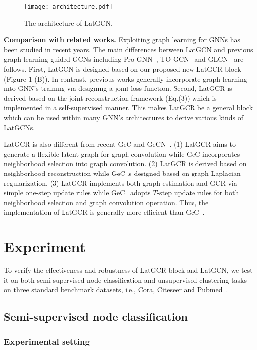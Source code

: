\documentclass{article}
\begin{document}
\begin{figure*}[ht]
\centering
\texttt{[image: architecture.pdf]}
  \caption{The architecture of LatGCN.}\label{fig:architecture}
\end{figure*}



\textbf{Comparison with related works.}
Exploiting graph learning for GNNs has been studied in recent years.
The main differences between LatGCN and previous graph learning guided GCNs including Pro-GNN~\cite{prognn}, TO-GCN~\cite{TOGCN} and GLCN~\cite{GLCN} are follows.
First, LatGCN is designed based on our proposed new LatGCR block (Figure 1 (B)).
In contrast, previous works generally incorporate graph learning into GNN's training via designing a joint loss function.
Second, LatGCR is derived based on the joint reconstruction framework (Eq.(3)) which is implemented in a self-supervised manner. This makes LatGCR be a general block which can be used within many GNN's architectures to derive various kinds of LatGCNs.

LatGCR is also different from recent GeC and GeCN~\cite{GECN}.
(1) LatGCR aims to generate  a flexible latent graph for graph convolution while GeC incorporates  neighborhood selection into graph convolution.
(2) LatGCR is derived based on neighborhood reconstruction while GeC is designed based on graph Laplacian regularization.
(3) LatGCR implements both graph estimation and GCR via simple one-step update rules while  GeC~\cite{GECN} adopts $T$-step update rules for both neighborhood selection and graph convolution operation. Thus, the implementation of LatGCR is generally more efficient than GeC~\cite{GECN}.



\section{Experiment}

To verify the effectiveness and robustness of LatGCR block and LatGCN, we test it on both semi-supervised node classification and unsupervised clustering tasks on three standard benchmark datasets, i.e., Cora, Citeseer and Pubmed~\cite{sen2008collective,prognn}.

\subsection{Semi-supervised node classification}

\subsubsection{Experimental setting}
\end{document}
